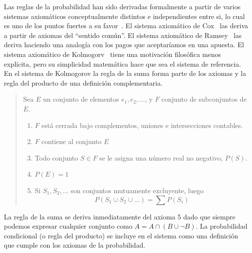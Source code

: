 \documentclass[a4paper,10pt]{book}
\theoremstyle{definition}
\begin{document}
Las reglas de la probabilidad han sido derivadas formalmente a partir de varios sistemas axiom\'aticos conceptualmente distintos e independientes entre si, lo cual es uno de los puntos fuertes a su favor~\cite{halpern2017}.
%
El sistema axiom\'atico de Cox~\cite{cox} las deriva a partir de axiomas del ``sentido común''.
%
El sistema axiom\'atico de Ramsey~\cite{ramsey} las deriva haciendo una analog\'ia con los pagos que aceptar\'iamos en una apuesta. 
%
El sistema axiom\'atico de Kolmogorv~\cite{kolmogorov} tiene una motivaci\'on filos\'ofica menos expl\'icita, pero su simplicidad matem\'atica hace que sea el sistema de referencia.
%
En el sistema de Kolmogorov la regla de la suma forma parte de los axiomas y la regla del producto de una definici\'on complementaria.
%
\begin{quotation}
Sea $E$ un conjunto de elementos $e_1, e_2, \dots$, y $F$ conjunto de subconjuntos de $E$.
%
\begin{enumerate}\itemsep-0.05cm
\item $F$ est\'a cerrada bajo complementos, uniones e intersecciones contables.
\item $F$ contiene al conjunto $E$
\item Todo conjunto $S \in F$ se le asigna una n\'umero real no negativo, $P(S)$.
\item $P(E) = 1$
\item Si $S_1, S_2, \dots$ son conjuntos mutuamente excluyente, luego
\begin{equation}
P(S_1 \cup S_2 \cup \dots ) = \sum P(S_i)
\end{equation}
\end{enumerate}
\end{quotation}
%
La regla de la suma se deriva inmediatamente del axioma 5 dado que siempre podemos expresar cualquier conjunto como $A = A \cap (B \cup \neg B)$.
%
La probabilidad condicional (o regla del producto) se incluye en el sistema como una definici\'on que cumple con los axiomas de la probabilidad. 

\end{document}
